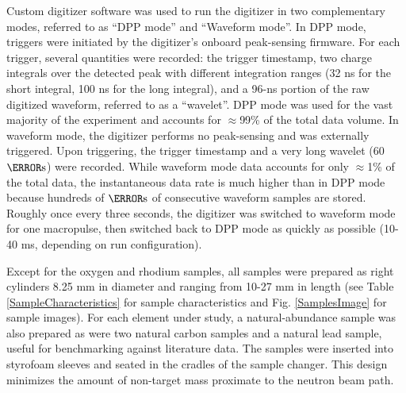 \documentclass[twocolumn,secnumarabic,amssymb, nobibnotes, aps, prl,
superscriptaddress, nobalancelastpage]{revtex4}
\begin{document}
Custom digitizer software was used to run the 
digitizer in two complementary modes, referred to as ``DPP mode'' and ``Waveform 
mode''. In DPP mode, triggers were initiated by the digitizer's onboard
peak-sensing firmware. For each trigger, several quantities were recorded: the trigger 
timestamp, two charge integrals over the detected peak with different
integration ranges (32 ns for the short integral, 100 ns for the long integral),
and a 96-ns portion of the raw digitized waveform, referred to as a ``wavelet''.
DPP mode was used for the vast majority of the 
experiment and accounts for $\approx$99\% of the total data volume. In waveform mode, 
the digitizer performs no peak-sensing and was externally triggered. Upon 
triggering, the trigger timestamp and a very long wavelet (60 $\micro\second$) 
were recorded. While waveform mode data accounts for only $\approx$1\% of the total data, 
the instantaneous data rate is much higher than in DPP 
mode because hundreds of $\micro\second$ of consecutive waveform samples are 
stored. Roughly once every three seconds, the digitizer was switched to 
waveform mode for one macropulse, then switched back to DPP mode as quickly as
possible (10-40 ms, depending on run configuration).  

Except for the oxygen and rhodium samples, all samples were prepared as right
cylinders 8.25 mm in diameter and ranging from 10-27 mm in length (see
Table \ref{SampleCharacteristics} for sample characteristics and Fig. \ref{SamplesImage}
for sample images). For each element under study, a natural-abundance sample
was also prepared as were two natural carbon
samples and a natural lead sample, useful for benchmarking against
literature data. The samples
were inserted into styrofoam sleeves and seated in the cradles of the sample
changer. This design minimizes the amount of non-target mass proximate to the
neutron beam path.
\end{document}
